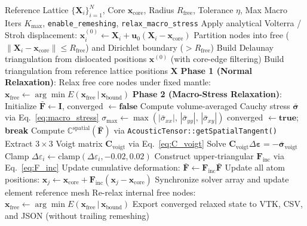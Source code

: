 \documentclass[11pt,a4paper]{article}
\begin{document}
\begin{algorithm}[h!]
\caption{Full Dislocation Relaxation: Remesh $\to$ Normal Relaxation $\to$ Cauchy Relaxation}
\label{alg:macro_stress}
\begin{algorithmic}[1]
\Require Reference Lattice $\{ \mathbf{X}_i \}_{i=1}^N$, Core $\mathbf{x}_{\text{core}}$, Radius $R_{\text{free}}$, Tolerance $\eta$, Max Macro Iters $K_{\max}$, \texttt{enable\_remeshing}, \texttt{relax\_macro\_stress}
\State Apply analytical Volterra / Stroh displacement: $\mathbf{x}_i^{(0)} \gets \mathbf{X}_i + \mathbf{u}_0(\mathbf{X}_i - \mathbf{x}_{\text{core}})$
\State Partition nodes into free ($\|\mathbf{X}_i - \mathbf{x}_{\text{core}}\| \le R_{\text{free}}$) and Dirichlet boundary ($> R_{\text{free}}$)
    \State Build Delaunay triangulation from dislocated positions $\mathbf{x}^{(0)}$ (with core-edge filtering)
\Else
    \State Build triangulation from reference lattice positions $\mathbf{X}$
\EndIf
\State \textbf{Phase 1 (Normal Relaxation)}: Relax free core nodes under fixed mantle: $\mathbf{x}_{\text{free}} \gets \arg\min E(\mathbf{x}_{\text{free}} \,|\, \mathbf{x}_{\text{bound}})$
    \State \textbf{Phase 2 (Macro-Stress Relaxation)}: Initialize $\bar{\mathbf{F}} \gets \mathbf{I}$, converged $\gets \mathbf{false}$
        \State Compute volume-averaged Cauchy stress $\bar{\boldsymbol{\sigma}}$ via Eq.~\eqref{eq:macro_stress}
        \State $\sigma_{\max} \gets \max\left( |\bar{\sigma}_{xx}|, \, |\bar{\sigma}_{yy}|, \, |\bar{\sigma}_{xy}| \right)$
        \If{$\sigma_{\max} < \eta$}
            \State converged $\gets \mathbf{true}$; \textbf{break}
        \EndIf
        \State Compute $\mathbb{C}^{\text{spatial}}(\bar{\mathbf{F}})$ via \texttt{AcousticTensor::getSpatialTangent()}
        \State Extract $3 \times 3$ Voigt matrix $\mathbf{C}_{\text{voigt}}$ via Eq.~\eqref{eq:C_voigt}
        \State Solve $\mathbf{C}_{\text{voigt}} \Delta\boldsymbol{\varepsilon} = -\bar{\boldsymbol{\sigma}}_{\text{voigt}}$
        \State Clamp $\Delta\varepsilon_i \gets \mathrm{clamp}(\Delta\varepsilon_i, -0.02, 0.02)$
        \State Construct upper-triangular $\mathbf{F}_{\text{inc}}$ via Eq.~\eqref{eq:F_inc}
        \State Update cumulative deformation: $\bar{\mathbf{F}} \gets \mathbf{F}_{\text{inc}} \bar{\mathbf{F}}$
        \State Update all atom positions: $\mathbf{x}_j \gets \mathbf{x}_{\text{core}} + \mathbf{F}_{\text{inc}} (\mathbf{x}_j - \mathbf{x}_{\text{core}})$
        \State Synchronize solver array and update element reference mesh
        \State Re-relax internal free nodes: $\mathbf{x}_{\text{free}} \gets \arg\min E(\mathbf{x}_{\text{free}} \,|\, \mathbf{x}_{\text{bound}})$
    \EndFor
\EndIf
\State Export converged relaxed state to VTK, CSV, and JSON (without trailing remeshing)
\end{algorithmic}
\end{algorithm}
\end{document}
